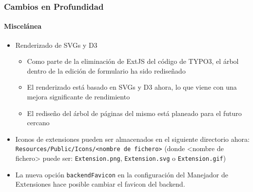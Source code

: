 \begin{frame}[fragile]
	\frametitle{Cambios en Profundidad}
	\framesubtitle{Miscelánea}

	\begin{itemize}

		\item Renderizado de SVGs y D3

			\begin{itemize}
				\item Como parte de la eliminación de ExtJS del código de TYPO3, el árbol dentro de la edición de formulario ha sido rediseñado
				\item El renderizado está basado en SVGs y D3 ahora, lo que viene con una mejora significante de rendimiento
				\item El rediseño del árbol de páginas del mismo está planeado para el futuro cercano
			\end{itemize}

		\item Iconos de extensiones pueden ser almacenados en el siguiente directorio ahora:\newline
			\small
				\texttt{Resources/Public/Icons/<nombre de fichero>}
				(donde <nombre de fichero> puede ser: \texttt{Extension.png}, \texttt{Extension.svg} o \texttt{Extension.gif})
			\normalsize

		\item La nueva opción \texttt{backendFavicon} en la configuración del Manejador de Extensiones hace posible
			cambiar el favicon del backend.

	\end{itemize}

\end{frame}

